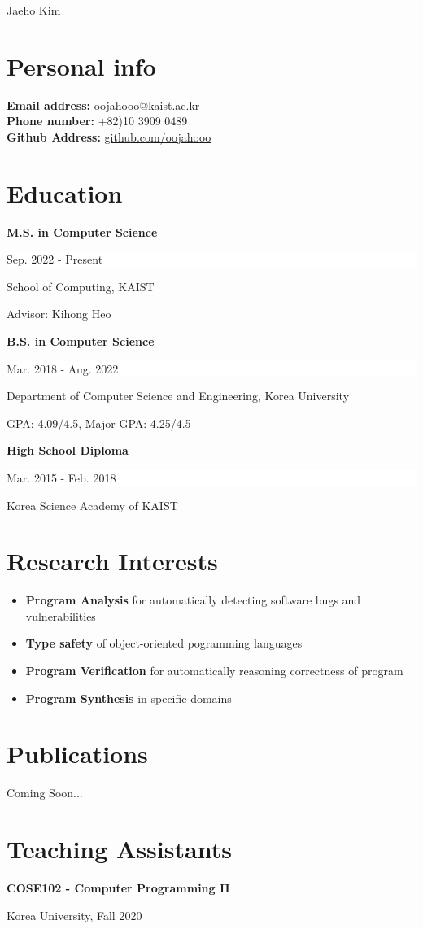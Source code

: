 \documentclass[paper=a4,fontsize=11pt]{scrartcl} %
\newlength{\spacebox}
\newcommand{\MyName}[1]{ %
                \Huge \hfill #1
                \par \normalsize \normalfont}
\newcommand{\NewPart}[1]{\section*{{#1}}}
\newcommand{\PersonalEntry}[2]{
		\noindent\hangindent=2em\hangafter=0 %
		\parbox{\spacebox}{        %
		\textit{#1}}		       %
		\hspace{1.5em} #2 \par}    %
\newcommand{\SkillsEntry}[2]{      %
		\noindent\hangindent=2em\hangafter=0 %
		\parbox{\spacebox}{        %
		\textit{#1}}			   %
		\hspace{1.5em} #2 \par}    %
\newcommand{\EducationEntry}[4]{
		\noindent \textbf{#1} \hfill      %
		\colorbox{White}{%
			\parbox{5cm}{%
			\hfill\color{Black}#2}} \par  %
		\noindent #3 \par        %
		\noindent\small #4 %
		\normalsize \par}
\begin{document}

\MyName{Jaeho Kim}



\NewPart{Personal info}{}
\textbf{Email address:} oojahooo@kaist.ac.kr \\
\textbf{Phone number:} +82)10 3909 0489  \\
\textbf{Github Address:} \href{https://github.com/oojahooo}{github.com/oojahooo}

\NewPart{Education}{}

\EducationEntry{M.S. in Computer Science}{Sep. 2022 - Present}{School of Computing, KAIST}{
	Advisor: Kihong Heo
}

\EducationEntry{B.S. in Computer Science}{Mar. 2018 - Aug. 2022}{Department of Computer Science and Engineering, Korea University}{
	GPA: 4.09/4.5, Major GPA: 4.25/4.5 \\
}

\EducationEntry{High School Diploma}{Mar. 2015 - Feb. 2018}{Korea Science Academy of KAIST}{}

\NewPart{Research Interests}{}

\begin{itemize}
	\item \textbf{Program Analysis} for automatically detecting software bugs and vulnerabilities
	\item \textbf{Type safety} of object-oriented pogramming languages
	\item \textbf{Program Verification} for automatically reasoning correctness of program
	\item \textbf{Program Synthesis} in specific domains
\end{itemize}


\NewPart{Publications}{}

Coming Soon...

\newpage

\NewPart{Teaching Assistants}{}

\EducationEntry{COSE102 - Computer Programming II}{}{Korea University, Fall 2020}{}



\end{document}
